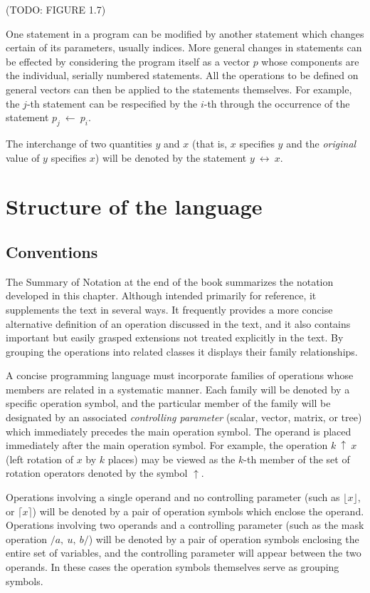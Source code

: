 \par (TODO: FIGURE 1.7)

\par One statement in a program can be modified by another statement which changes certain of its parameters, usually indices. More general changes in statements can be effected by considering the program itself as a vector $p$ whose components are the individual, serially numbered statements. All the operations to be defined on general vectors can then be applied to the statements themselves. For example, the $j$-th statement can be respecified by the $i$-th through the occurrence of the statement $p_j\ ←\ p_i$.

\par The interchange of two quantities $y$ and $x$ (that is, $x$ specifies $y$ and the \textit{original} value of $y$ specifies $x$) will be denoted by the statement $y\ \leftrightarrow\ x$.

\section{Structure of the language}

\subsection*{Conventions}

\par The Summary of Notation at the end of the book summarizes the notation developed in this chapter. Although intended primarily for reference, it supplements the text in several ways. It frequently provides a more concise alternative definition of an operation discussed in the text, and it also contains important but easily grasped extensions not treated explicitly in the text. By grouping the operations into related classes it displays their family relationships.

\par A concise programming language must incorporate families of operations whose members are related in a systematic manner. Each family will be denoted by a specific operation symbol, and the particular member of the family will be designated by an associated \textit{controlling parameter} (scalar, vector, matrix, or tree) which immediately precedes the main operation symbol. The operand is placed immediately after the main operation symbol. For example, the operation $k\ ↑\ x$ (left rotation of $x$ by $k$ places) may be viewed as the $k$-th member of the set of rotation operators denoted by the symbol $↑$.

\par Operations involving a single operand and no controlling parameter (such as $\lfloor x \rfloor$, or $\lceil x \rceil$) will be denoted by a pair of operation symbols which enclose the operand. Operations involving two operands and a controlling parameter (such as the mask operation $/a,\ u,\ b/$) will be denoted by a pair of operation symbols enclosing the entire set of variables, and the controlling parameter will appear between the two operands. In these cases the operation symbols themselves serve as grouping symbols.
